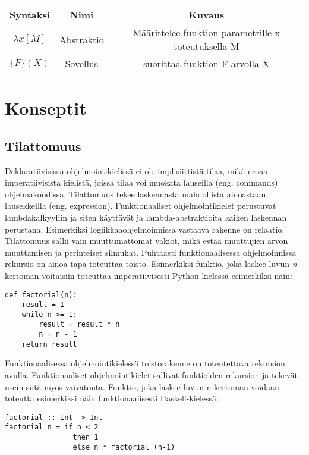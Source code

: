 \begin{center}
  \begin{tabular}{ |c|c|c| } 
    \hline
    Syntaksi & Nimi & Kuvaus \\ [0.5ex] 
    \hline
    $ \lambda x [ M ] $ & Abstraktio & Määrittelee funktion parametrille x toteutuksella M \\ 
    \hline
    $ \{ F \} ( X ) $ & Sovellus & suorittaa funktion F arvolla X \\ 
    \hline
  \end{tabular}
\end{center}\cite{lambdacalculus}


\section{Konseptit}

\subsection{Tilattomuus}
Deklaratiivisissa ohjelmointikielissä ei ole implisiittistä tilaa, mikä eroaa imperatiivisista kielistä, joissa tilaa
voi muokata lauseilla (eng. commands) ohjelmakoodissa. Tilattomuus tekee laskennasta mahdollista ainoastaan lausekkeilla
(eng. expression). Funktionaaliset ohjelmointikielet perustuvat lambdakalkyyliin ja siten käyttävät ja
lambda-abstraktioita kaiken laskennan perustana. Esimerkiksi logiikkaaohjelmoinnissa vastaava rakenne on relaatio.
Tilattomuus sallii vain muuttumattomat vakiot, mikä estää muuttujien arvon muuttamisen ja perinteiset silmukat.
Puhtaasti funktionaalisessa ohjelmoinnissa rekursio on ainoa tapa toteuttaa toisto. Esimerkiksi funktio, joka laskee
luvun \textit{n} kertoman voitaisiin toteuttaa imperatiivisesti Python-kielessä esimerkiksi näin:
\begin{verbatim}
def factorial(n):
    result = 1
    while n >= 1:
        result = result * n
        n = n - 1
    return result
\end{verbatim}
Funktionaalisessa ohjelmointikielessä toistorakenne on toteutettava rekursion avulla. Funktionaaliset ohjelmointikielet
sallivat funktioiden rekursion ja tekevät usein siitä myös vaivatonta.\cite{hudak} Funktio, joka laskee luvun n kertoman
voidaan toteutta esimerkiksi näin funktionaalisesti Haskell-kielessä:
\begin{verbatim}
factorial :: Int -> Int
factorial n = if n < 2
                then 1
                else n * factorial (n-1)
\end{verbatim}


